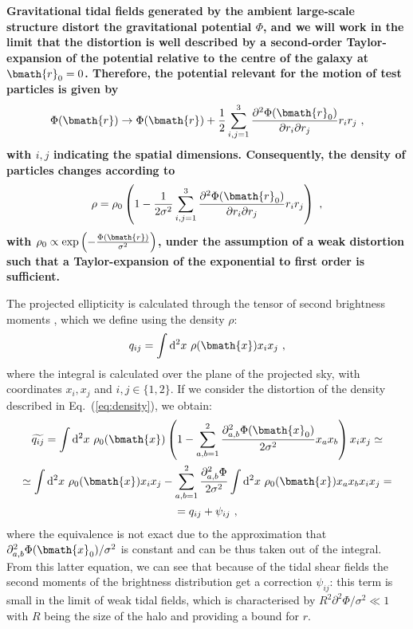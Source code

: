 \documentclass[a4paper,fleqn,usenatbib]{mnras}
\newcommand*\dif{\mathop{}\!\mathrm{d}} 	%
\newenvironment{correction}
 {\bfseries}%
  {}%
\begin{document}
\begin{correction}
Gravitational tidal fields generated by the ambient large-scale structure distort the gravitational potential $\Phi$, and we will work in the limit that the distortion is well described by a second-order Taylor-expansion of the potential relative to the centre of the galaxy at $\bmath{r}_0 = 0$. Therefore, the potential relevant for the motion of test particles is given by
\begin{equation}
\Phi(\bmath{r}) \rightarrow
\Phi(\bmath{r}) + \frac{1}{2}\sum_{i,j=1}^{3}\frac{\partial^2\Phi(\bmath{r}_0)}{\partial r_i\partial r_j}r_ir_j \ ,
\end{equation}
with $i,j$ indicating the spatial dimensions. Consequently, the density of particles changes according to
\begin{equation}
\label{eq:density}
\rho = \rho_0
\left(1-\frac{1}{2\sigma^2}\sum_{i,j=1}^{3}\frac{\partial^2\Phi(\bmath{r}_0)}{\partial r_i\partial r_j}r_ir_j\right) \ ,
\end{equation}
with $\rho_0 \propto \exp\left(-\frac{\Phi(\bmath{r})}{\sigma^2}\right)$, under the assumption of a weak distortion such that a Taylor-expansion of the exponential to first order is sufficient. 

The projected ellipticity is calculated through the tensor of second brightness moments \citep{BartelmannSchneider2001}, which we define using the density $\rho$:
\begin{equation}
q_{ij} = \int \dif^2x \ \rho(\bmath{x}) x_i x_j \ ,
\end{equation}
where the integral is calculated over the plane of the projected sky, with coordinates $x_i,x_j$ and $i,j \in \{1,2\}$. If we consider the distortion of the density described in Eq.~(\ref{eq:density}), we obtain:
\begin{multline}
\label{eq:bridis}
\widetilde{q_{ij}} = \int \dif^2x \ \rho_0(\bmath{x}) \left(1-\sum_{a,b=1}^2\frac{\partial_{a,b}^2\Phi(\bmath{x}_0)}{2\sigma^2} x_a x_b\right) x_i x_j \simeq \\ 
\simeq \int \dif^2 x \ \rho_0(\bmath{x}) x_i x_j - \sum_{a,b=1}^2\frac{\partial_{a,b}^2\Phi}{2\sigma^2} \int \dif^2 x \ \rho_0(\bmath{x}) x_a x_b x_i x_j = \\ = q_{ij} + \psi_{ij} \ ,
\end{multline}
where the equivalence is not exact due to the approximation that $\partial_{a,b}^2\Phi(\bmath{x}_0) / \sigma^2$ is constant and can be thus taken out of the integral. From this latter equation, we can see that because of the tidal shear fields the second moments of the brightness distribution get a correction $\psi_{ij}$: this term is small in the limit of weak tidal fields, which is characterised by $R^2\partial^2\Phi/\sigma^2\ll 1$ with $R$ being the size of the halo and providing a bound for $r$. 


\end{correction}
\end{document}
